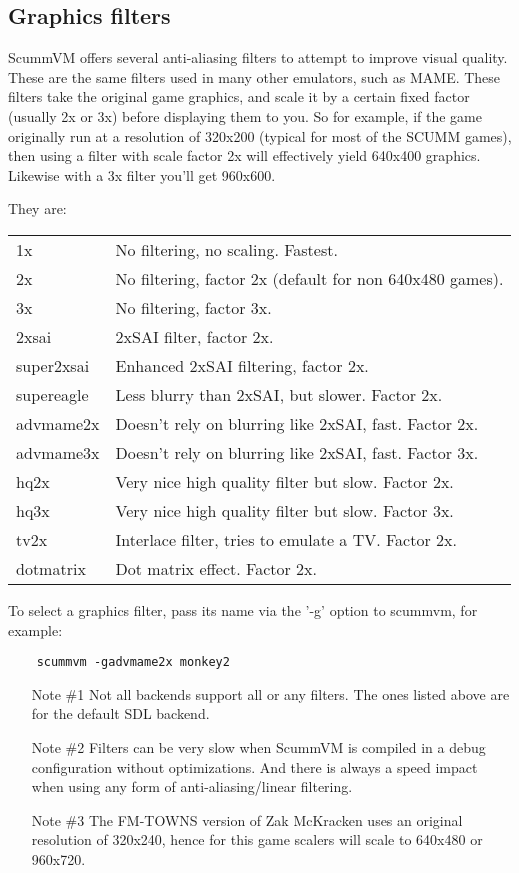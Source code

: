 


\subsection{Graphics filters} \label{sect-gfx-filters}

ScummVM offers several anti-aliasing filters to attempt to improve visual
quality. These are the same filters used in many other emulators, such as
MAME. These filters take the original game graphics, and scale it by a
certain fixed factor (usually 2x or 3x) before displaying them to you.
So for example, if the game originally run at a resolution of 320x200
(typical for most of the SCUMM games), then using a filter with scale
factor 2x will effectively yield 640x400 graphics. Likewise with a
3x filter you'll get 960x600.

They are:\\
\begin{tabular}[h]{ll}
  1x         & No filtering, no scaling. Fastest.\\
  2x         & No filtering, factor 2x (default for non 640x480 games).\\
  3x         & No filtering, factor 3x.\\
  2xsai      & 2xSAI filter, factor 2x.\\
  super2xsai & Enhanced 2xSAI filtering, factor 2x.\\
  supereagle & Less blurry than 2xSAI, but slower. Factor 2x.\\
  advmame2x  & Doesn't rely on blurring like 2xSAI, fast. Factor 2x.\\
  advmame3x  & Doesn't rely on blurring like 2xSAI, fast. Factor 3x.\\
  hq2x       & Very nice high quality filter but slow. Factor 2x.\\
  hq3x       & Very nice high quality filter but slow. Factor 3x.\\
  tv2x       & Interlace filter, tries to emulate a TV. Factor 2x.\\
  dotmatrix  & Dot matrix effect. Factor 2x.\\
\end{tabular}

To select a graphics filter, pass its name via the '-g' option to scummvm,
for example:

\begin{verbatim}
    scummvm -gadvmame2x monkey2
\end{verbatim}
\begin{enumerate}
\item [Note \#1] Not all backends support all or any filters. The ones
  listed above are for the default SDL backend.
\item [Note \#2] Filters can be very slow when ScummVM is compiled in a
  debug configuration without optimizations. And there is always a
  speed impact when using any form of anti-aliasing/linear filtering.
\item [Note \#3] The FM-TOWNS version of Zak McKracken uses an
  original resolution of 320x240, hence for this game scalers will
  scale to 640x480 or 960x720.
\end{enumerate}
